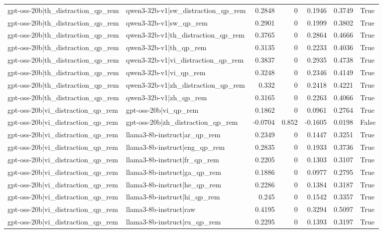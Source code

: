 \begin{table}
\begin{tabular}{l l r r r r l}
gpt-oss-20b|th_distraction_qp_rem & qwen3-32b-v1|sw_distraction_qp_rem & 0.2848 & 0 & 0.1946 & 0.3749 & True \\
gpt-oss-20b|th_distraction_qp_rem & qwen3-32b-v1|sw_qp_rem & 0.2901 & 0 & 0.1999 & 0.3802 & True \\
gpt-oss-20b|th_distraction_qp_rem & qwen3-32b-v1|th_distraction_qp_rem & 0.3765 & 0 & 0.2864 & 0.4666 & True \\
gpt-oss-20b|th_distraction_qp_rem & qwen3-32b-v1|th_qp_rem & 0.3135 & 0 & 0.2233 & 0.4036 & True \\
gpt-oss-20b|th_distraction_qp_rem & qwen3-32b-v1|vi_distraction_qp_rem & 0.3837 & 0 & 0.2935 & 0.4738 & True \\
gpt-oss-20b|th_distraction_qp_rem & qwen3-32b-v1|vi_qp_rem & 0.3248 & 0 & 0.2346 & 0.4149 & True \\
gpt-oss-20b|th_distraction_qp_rem & qwen3-32b-v1|zh_distraction_qp_rem & 0.332 & 0 & 0.2418 & 0.4221 & True \\
gpt-oss-20b|th_distraction_qp_rem & qwen3-32b-v1|zh_qp_rem & 0.3165 & 0 & 0.2263 & 0.4066 & True \\
gpt-oss-20b|vi_distraction_qp_rem & gpt-oss-20b|vi_qp_rem & 0.1862 & 0 & 0.0961 & 0.2764 & True \\
gpt-oss-20b|vi_distraction_qp_rem & gpt-oss-20b|zh_distraction_qp_rem & -0.0704 & 0.852 & -0.1605 & 0.0198 & False \\
gpt-oss-20b|vi_distraction_qp_rem & llama3-8b-instruct|ar_qp_rem & 0.2349 & 0 & 0.1447 & 0.3251 & True \\
gpt-oss-20b|vi_distraction_qp_rem & llama3-8b-instruct|eng_qp_rem & 0.2835 & 0 & 0.1933 & 0.3736 & True \\
gpt-oss-20b|vi_distraction_qp_rem & llama3-8b-instruct|fr_qp_rem & 0.2205 & 0 & 0.1303 & 0.3107 & True \\
gpt-oss-20b|vi_distraction_qp_rem & llama3-8b-instruct|ga_qp_rem & 0.1886 & 0 & 0.0977 & 0.2795 & True \\
gpt-oss-20b|vi_distraction_qp_rem & llama3-8b-instruct|he_qp_rem & 0.2286 & 0 & 0.1384 & 0.3187 & True \\
gpt-oss-20b|vi_distraction_qp_rem & llama3-8b-instruct|hi_qp_rem & 0.245 & 0 & 0.1542 & 0.3357 & True \\
gpt-oss-20b|vi_distraction_qp_rem & llama3-8b-instruct|raw & 0.4195 & 0 & 0.3294 & 0.5097 & True \\
gpt-oss-20b|vi_distraction_qp_rem & llama3-8b-instruct|ru_qp_rem & 0.2295 & 0 & 0.1393 & 0.3197 & True \\

\end{tabular}
\end{table}
